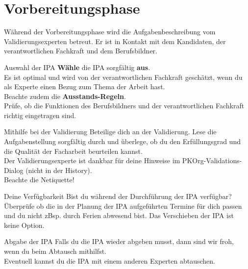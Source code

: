 \section{Vorbereitungsphase}
Während der Vorbereitungsphase wird die Aufgabenbeschreibung vom Validierungsexperten betreut. Er ist in Kontakt mit dem Kandidaten, der verantwortlichen Fachkraft und dem Berufsbildner.
\begin{taskitemwithoutcomment}{Auswahl der IPA}
  \textbf{Wähle} die IPA sorgfältig \textbf{aus}.\\Es ist optimal und wird von der verantwortlichen Fachkraft geschätzt, wenn du als Experte einen Bezug zum Thema der Arbeit hast.\\Beachte zudem die \textbf{Ausstands-Regeln}.\\Prüfe, ob die Funktionen des Berufsbildners und der verantwortlichen Fachkraft richtig eingetragen sind.
\end{taskitemwithoutcomment}
\begin{taskitem}{Mithilfe bei der Validierung}
  Beteilige dich an der Validierung. Lese die Aufgabenstellung sorgfältig durch und überlege, ob du den Erfüllungsgrad und die Qualität der Facharbeit beurteilen kannst.\\Der Validierungsexperte ist dankbar für deine Hinweise im PKOrg-Validations-Dialog (nicht in der History).\\Beachte die Netiquette!
\end{taskitem}
\begin{taskitemwithoutcomment}{Deine Verfügbarkeit}
  Bist du während der Durchführung der IPA verfügbar?\\Überprüfe ob die in der Planung der IPA aufgeführten Termine für dich passen und du nicht zBsp. durch Ferien abwesend bist. Das Verschieben der IPA ist keine Option.
\end{taskitemwithoutcomment}
\begin{taskitemwithoutcomment}{Abgabe der IPA}
  Falls du die IPA wieder abgeben musst, dann sind wir froh, wenn du beim Abtausch mithilfst.\\Eventuell kannst du die IPA mit einem anderen Experten abtauschen.
\end{taskitemwithoutcomment}